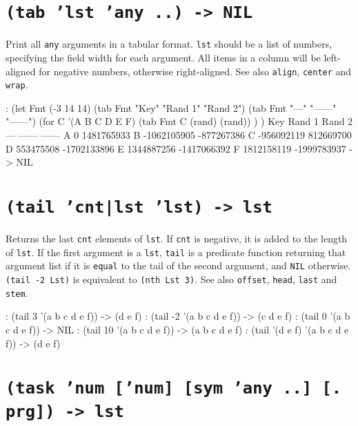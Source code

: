  
\section*{\texttt{(tab 'lst 'any ..) -> NIL}}
\label{sec:func-ref-T-(tab 'lst 'any ..) -> NIL}


Print all \texttt{any} arguments in a tabular format. \texttt{lst} should be a list of
numbers, specifying the field width for each argument. All items in a
column will be left-aligned for negative numbers, otherwise
right-aligned. See also \texttt{align}, \texttt{center} and \texttt{wrap}.


\begin{wideverbatim}
: (let Fmt (-3 14 14)
   (tab Fmt "Key" "Rand 1" "Rand 2")
   (tab Fmt "---" "------" "------")
   (for C '(A B C D E F)
      (tab Fmt C (rand) (rand)) ) )
Key        Rand 1        Rand 2
---        ------        ------
A               0    1481765933
B     -1062105905    -877267386
C      -956092119     812669700
D       553475508   -1702133896
E      1344887256   -1417066392
F      1812158119   -1999783937
-> NIL
\end{wideverbatim}

 
\section*{\texttt{(tail 'cnt|lst 'lst) -> lst}}
\label{sec:func-ref-T-(tail 'cnt|lst 'lst) -> lst}


Returns the last \texttt{cnt} elements of \texttt{lst}. If \texttt{cnt} is negative, it is
added to the length of \texttt{lst}. If the first argument is a \texttt{lst}, \texttt{tail}
is a predicate function returning that argument list if it is \texttt{equal} to
the tail of the second argument, and \texttt{NIL} otherwise. \texttt{(tail -2 Lst)} is
equivalent to \texttt{(nth Lst 3)}. See also \texttt{offset}, \texttt{head}, \texttt{last} and
\texttt{stem}.


\begin{wideverbatim}
: (tail 3 '(a b c d e f))
-> (d e f)
: (tail -2 '(a b c d e f))
-> (c d e f)
: (tail 0 '(a b c d e f))
-> NIL
: (tail 10 '(a b c d e f))
-> (a b c d e f)
: (tail '(d e f) '(a b c d e f))
-> (d e f)
\end{wideverbatim}

 
\section*{\texttt{(task 'num ['num] [sym 'any ..] [. prg]) -> lst}}
\label{sec:func-ref-T-(task 'num ['num] [sym 'any ..] [. prg]) -> lst}


